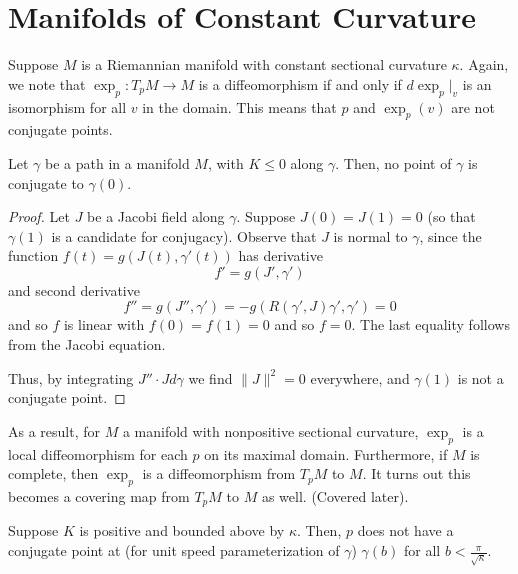 \documentclass[../main.tex]{subfiles}
\begin{document}
\section{Manifolds of Constant Curvature}
Suppose $M$ is a Riemannian manifold with constant sectional curvature $\kappa$.
Again, we note that $\exp_p:T_pM\to M$ is a diffeomorphism if and only if
$d\exp_p|_v$ is an isomorphism for all $v$ in the domain. This means that $p$
and $\exp_p(v)$ are not conjugate points.

\begin{prop}
    Let $\gamma$ be a path in a manifold $M$, with $K\leq 0$ along $\gamma$.
    Then, no point of $\gamma$ is conjugate to $\gamma(0)$.
\end{prop}

\begin{proof}
    Let $J$ be a Jacobi field along $\gamma$. Suppose $J(0)=J(1)=0$ (so that
    $\gamma(1)$ is a candidate for conjugacy). Observe that $J$ is normal to
    $\gamma$, since the function $f(t) = g(J(t),\gamma'(t))$ has derivative
    \[
        f' = g(J',\gamma')
    \]
    and second derivative
    \[
    f'' = g(J'',\gamma') = -g(R(\gamma',J)\gamma',\gamma') = 0
    \]
    and so $f$ is linear with $f(0)=f(1)=0$ and so $f=0$. The last equality
    follows from the Jacobi equation.

    Thus, by integrating $J''\cdot Jd\gamma$ we find $\|J\|^2=0$ everywhere, and
    $\gamma(1)$ is not a conjugate point.
\end{proof}

As a result, for $M$ a manifold with nonpositive sectional curvature, $\exp_p$
is a local diffeomorphism for each $p$ on its maximal domain. Furthermore, if
$M$ is complete, then $\exp_p$ is a diffeomorphism from $T_pM$ to $M$. It turns
out this becomes a covering map from $T_pM$ to $M$ as well. (Covered later).

Suppose $K$ is positive and bounded above by $\kappa$. Then, $p$ does not have a conjugate
point at (for unit speed parameterization of $\gamma$) $\gamma(b)$ for all $b <
\frac{\pi}{\sqrt{\kappa}}$.
\end{document}

